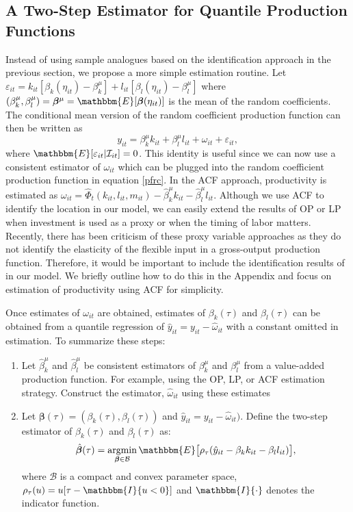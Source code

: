 \documentclass[11pt]{article}
\begin{document}
\subsection{A Two-Step Estimator for Quantile Production Functions}
Instead of using sample analogues based on the identification approach in the previous section, we propose a more simple estimation routine. Let $\varepsilon_{it}=k_{it}[\beta_{k}(\eta_{it})-\beta^{\mu}_{k}]+l_{it}[\beta_{l}(\eta_{it})-\beta^{\mu}_{l}]$ where $(\beta_{k}^{\mu}, \beta_{l}^{\mu})=\boldsymbol{\beta}^{\mu}=\mathbbm{E}[\boldsymbol{\beta}(\eta_{it})]$ is the mean of the random coefficients. The conditional mean version of the random coefficient production function can then be written as
\begin{equation}
y_{it}=\beta_{k}^{\mu}k_{it}+\beta_{l}^{\mu}l_{it}+\omega_{it}+\varepsilon_{it},
\end{equation}
where $\mathbbm{E}[\varepsilon_{it}|\mathcal{I}_{it}]=0$. This identity is useful since we can now use a consistent estimator of $\omega_{it}$ which can be plugged into the random coefficient production function in equation \eqref{pfrc}. In the ACF approach, productivity is estimated as $\omega_{it}=\hat{\Phi}_{t}(k_{it}, l_{it}, m_{it})-\hat{\beta}^{\mu}_{k}k_{it}-\hat{\beta}^{\mu}_{l}l_{it}$. Although we use ACF to identify the location in our model, we can easily extend the results of OP or LP when investment is used as a proxy or when the timing of labor matters. Recently, there has been criticism of these proxy variable approaches as they do not identify the elasticity of the flexible input in a gross-output production function. Therefore, it would be important to include the identification results of \cite{Gandhi2020} in our model. We briefly outline how to do this in the Appendix and focus on estimation of productivity using ACF for simplicity.

Once estimates of $\omega_{it}$ are obtained, estimates of $\beta_{k}(\tau)$ and $\beta_{l}(\tau)$
can be obtained from a quantile regression of $\hat{y}_{it}=y_{it}-\hat{\omega}_{it}$ with a constant omitted in estimation. To summarize these steps:
\begin{enumerate}
	\item Let $\hat{\beta}_{k}^{\mu}$ and $\hat{\beta}_{l}^{\mu}$ be consistent estimators of $\beta_{k}^{\mu}$ and $\beta_{l}^{\mu}$ from a value-added production function. For example, using the OP, LP, or ACF estimation strategy. Construct the estimator, $\hat{\omega}_{it}$ using these estimates
	\item Let $\boldsymbol{\beta}(\tau)=(\beta_{k}(\tau), \beta_{l}(\tau))$ and $\hat{y}_{it}=y_{it}-\hat{\omega}_{it})$. Define the two-step estimator of $\beta_{k}(\tau)$ and $\beta_{l}(\tau)$ as:
	\begin{equation*}
	\hat{\boldsymbol{\beta}}(\tau)=\underset{\boldsymbol{\beta}\in\mathcal{B}}{\operatorname{argmin}}\, \mathbbm{E}\big[\rho_{\tau}(\hat{y}_{it}-\beta_{k}k_{it}-\beta_{l}l_{it})\big],
	\end{equation*}
	where $\mathcal{B}$ is a compact and convex parameter space, $\rho_{\tau}(u)=u[\tau-\mathbbm{I}\{u<0\}]$ and $\mathbbm{I}\{\cdot\}$ denotes the indicator function.
\end{enumerate}
\end{document}

